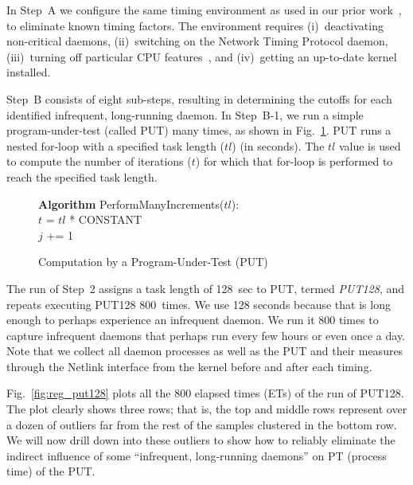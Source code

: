 \documentclass[letter]{ieice}
\begin{document}
In Step~A we configure the same timing environment as used in our prior work~\cite{Currim}, 
to eliminate known timing factors. 
The environment requires (i)~deactivating non-critical daemons, 
(ii)~switching on the Network Timing Protocol daemon,  
(iii)~turning off particular CPU features~\cite{intel15,intelSpeed15}, 
and (iv)~getting an up-to-date kernel installed.

Step~B consists of eight sub-steps, resulting in determining 
the cutoffs for each identified infrequent, long-running daemon. 
In Step~B-1, we run a simple program-under-test (called PUT) many times, as shown in Fig.~\ref{alg:put}. 
PUT runs a nested for-loop with a specified task length ($tl$) (in seconds). 
The $tl$ value is used to compute 
the number of iterations ($t$) for which that for-loop is performed 
to reach the specified task length.

\begin{figure}[h]
\begin{center}
\begin{algorithmic}
{\bf Algorithm} PerformManyIncrements($tl$): \\
\STATE $t$ = $tl$ * {CONSTANT} \\
		\STATE $j$ += 1 \\
	\ENDFOR 
\ENDFOR 
\end{algorithmic}
\end{center}
\caption{Computation by a Program-Under-Test (PUT)\label{alg:put}}
\end{figure}

The run of Step~2 assigns a task length of 128~sec to PUT, termed {\em PUT128}, and repeats executing PUT128 800~times.
We use 128 seconds because that is long enough to perhaps experience an infrequent daemon. 
We run it 800 times to capture infrequent daemons that perhaps run every few hours or even 
once a day. 
Note that we collect all daemon processes as well as the PUT and their measures 
through the Netlink interface from the kernel before and after each 
timing.

Fig.~\ref{fig:reg_put128} plots all the 800 elapsed times (ETs) of the run of PUT128.
The plot clearly shows three rows; that is, 
the top and middle rows represent over a dozen of outliers far from 
the rest of the samples clustered in the bottom row. 
We will now drill down into these outliers to 
show how to reliably eliminate the indirect influence of 
some ``infrequent, \hbox{long-running} daemons'' on PT (\hbox{process} time) of the PUT.
\end{document}
